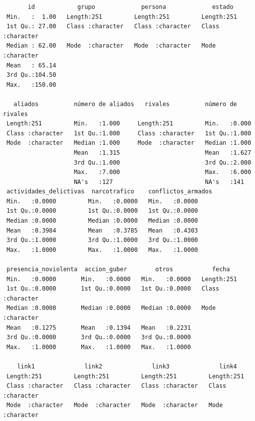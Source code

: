 \documentclass[
]{article}
\begin{document}
\begin{verbatim}
       id            grupo             persona             estado         
 Min.   :  1.00   Length:251         Length:251         Length:251        
 1st Qu.: 27.00   Class :character   Class :character   Class :character  
 Median : 62.00   Mode  :character   Mode  :character   Mode  :character  
 Mean   : 65.14                                                           
 3rd Qu.:104.50                                                           
 Max.   :150.00                                                           
                                                                          
   aliados          número de aliados   rivales          número de rivales
 Length:251         Min.   :1.000     Length:251         Min.   :0.000    
 Class :character   1st Qu.:1.000     Class :character   1st Qu.:1.000    
 Mode  :character   Median :1.000     Mode  :character   Median :1.000    
                    Mean   :1.315                        Mean   :1.627    
                    3rd Qu.:1.000                        3rd Qu.:2.000    
                    Max.   :7.000                        Max.   :6.000    
                    NA's   :127                          NA's   :141      
 actividades_delictivas  narcotrafico    conflictos_armados
 Min.   :0.0000         Min.   :0.0000   Min.   :0.0000    
 1st Qu.:0.0000         1st Qu.:0.0000   1st Qu.:0.0000    
 Median :0.0000         Median :0.0000   Median :0.0000    
 Mean   :0.3984         Mean   :0.3785   Mean   :0.4303    
 3rd Qu.:1.0000         3rd Qu.:1.0000   3rd Qu.:1.0000    
 Max.   :1.0000         Max.   :1.0000   Max.   :1.0000    
                                                           
 presencia_noviolenta  accion_guber        otros           fecha          
 Min.   :0.0000       Min.   :0.0000   Min.   :0.0000   Length:251        
 1st Qu.:0.0000       1st Qu.:0.0000   1st Qu.:0.0000   Class :character  
 Median :0.0000       Median :0.0000   Median :0.0000   Mode  :character  
 Mean   :0.1275       Mean   :0.1394   Mean   :0.2231                     
 3rd Qu.:0.0000       3rd Qu.:0.0000   3rd Qu.:0.0000                     
 Max.   :1.0000       Max.   :1.0000   Max.   :1.0000                     
                                                                          
    link1              link2              link3              link4          
 Length:251         Length:251         Length:251         Length:251        
 Class :character   Class :character   Class :character   Class :character  
 Mode  :character   Mode  :character   Mode  :character   Mode  :character  
                                                                            

\end{verbatim}
\end{document}
